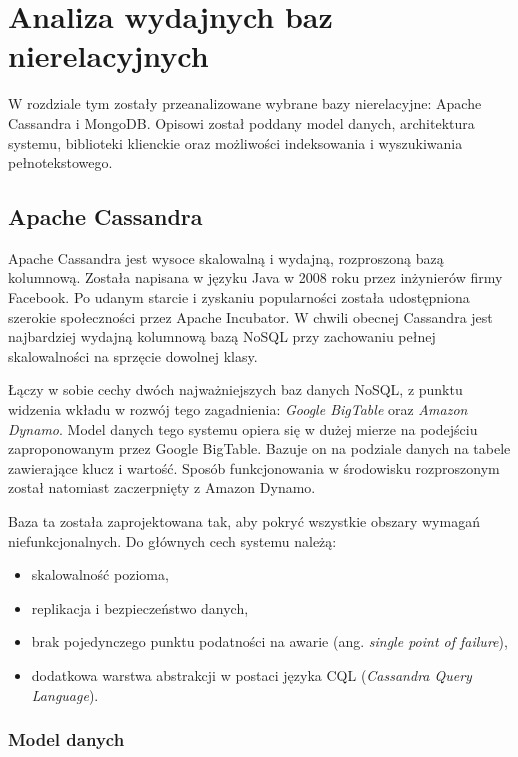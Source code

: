 \chapter{Analiza wydajnych baz nierelacyjnych}

W rozdziale tym zostały przeanalizowane wybrane bazy nierelacyjne: Apache Cassandra i MongoDB.
Opisowi został poddany model danych, architektura systemu, biblioteki klienckie oraz możliwości indeksowania i wyszukiwania pełnotekstowego. 

\section{Apache Cassandra}

Apache Cassandra jest wysoce skalowalną i wydajną, rozproszoną bazą kolumnową.
Została napisana w języku Java w 2008 roku przez inżynierów firmy Facebook.
Po udanym starcie i zyskaniu popularności została udostępniona szerokie społeczności przez Apache Incubator.
W chwili obecnej Cassandra jest najbardziej wydajną kolumnową bazą NoSQL przy zachowaniu pełnej skalowalności na sprzęcie dowolnej klasy.

Łączy w sobie cechy dwóch najważniejszych baz danych NoSQL, z punktu widzenia wkładu w rozwój tego zagadnienia: \textit{Google BigTable} oraz \textit{Amazon Dynamo}.
Model danych tego systemu opiera się w dużej mierze na podejściu zaproponowanym przez Google BigTable.
Bazuje on na podziale danych na tabele zawierające klucz i wartość.
Sposób funkcjonowania w środowisku rozproszonym został natomiast zaczerpnięty z Amazon Dynamo.

Baza ta została zaprojektowana tak, aby pokryć wszystkie obszary wymagań niefunkcjonalnych.
Do głównych cech systemu należą:
\begin{itemize}
    \item skalowalność pozioma,
    \item replikacja i bezpieczeństwo danych,
    \item brak pojedynczego punktu podatności na awarie (ang. \textit{single point of failure}),
    \item dodatkowa warstwa abstrakcji w postaci języka CQL (\textit{Cassandra Query Language}).
\end{itemize}

\subsection{Model danych}

